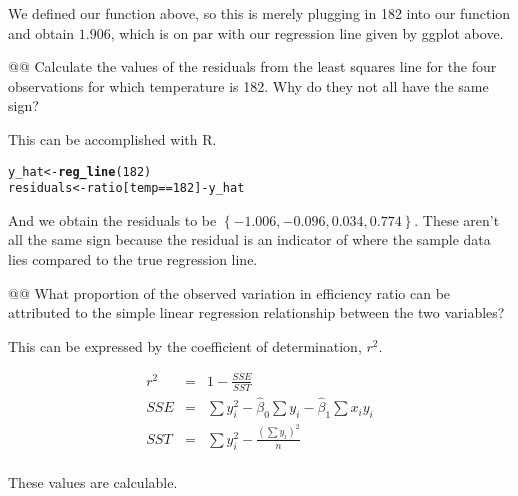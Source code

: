 \documentclass[10pt]{article}\usepackage[]{graphicx}\usepackage[]{xcolor}
\makeatletter
\newcommand{\hlnum}[1]{\textcolor[rgb]{0.686,0.059,0.569}{#1}}%
\newcommand{\hlopt}[1]{\textcolor[rgb]{0,0,0}{#1}}%
\newcommand{\hlstd}[1]{\textcolor[rgb]{0.345,0.345,0.345}{#1}}%
\newcommand{\hlkwb}[1]{\textcolor[rgb]{0.69,0.353,0.396}{#1}}%
\newcommand{\hlkwd}[1]{\textcolor[rgb]{0.737,0.353,0.396}{\textbf{#1}}}%
\newenvironment{kframe}{%
 \def\at@end@of@kframe{}%
 \ifinner\ifhmode%
  \def\at@end@of@kframe{\end{minipage}}%
  \begin{minipage}{\columnwidth}%
 \fi\fi%
 \def\FrameCommand##1{\hskip\@totalleftmargin \hskip-\fboxsep
 \colorbox{shadecolor}{##1}\hskip-\fboxsep
     \hskip-\linewidth \hskip-\@totalleftmargin \hskip\columnwidth}%
 \MakeFramed {\advance\hsize-\width
   \@totalleftmargin\z@ \linewidth\hsize
   \@setminipage}}%
 {\par\unskip\endMakeFramed%
 \at@end@of@kframe}
\newenvironment{knitrout}{}{} %
\makeatother
\begin{document}
\begin{easylist}[enumerate]
    We defined our function above, so this is merely plugging in 182 into our function and obtain
    $1.906$, which is on par with our regression line given by ggplot above.

    @@ Calculate the values of the residuals from the least squares line for the four observations for which temperature
    is 182. Why do they not all have the same sign?\newline

    This can be accomplished with R.

\begin{knitrout}
\color{fgcolor}\begin{kframe}
\begin{alltt}
         \hlstd{y_hat} \hlkwb{<-} \hlkwd{reg_line}\hlstd{(}\hlnum{182}\hlstd{)}
         \hlstd{residuals} \hlkwb{<-} \hlstd{ratio[temp} \hlopt{==} \hlnum{182}\hlstd{]} \hlopt{-} \hlstd{y_hat}
\end{alltt}
\end{kframe}
\end{knitrout}


    And we obtain the residuals to be $\left\{-1.006, -0.096, 0.034, 0.774\right\}$. These aren't all the same sign because the
    residual is an indicator of where the sample data lies compared to the true regression line.

    @@ What proportion of the observed variation in efficiency ratio can be attributed to the simple linear regression
    relationship between the two variables?\newline

    This can be expressed by the coefficient of determination, $r^2$.

    \begin{equation}
        \begin{aligned}
            r^2 &=& 1 - \frac{SSE}{SST}\\
            SSE &=& \sum y_i^2 - \hat{\beta}_0 \sum y_i - \hat{\beta}_1 \sum x_i y_i\\
            SST &=& \sum y_i^2 - \frac{{\left( \sum y_i \right)}^2}{n}\\
        \end{aligned}
    \end{equation}

    These values are calculable.


\end{easylist}
\end{document}
